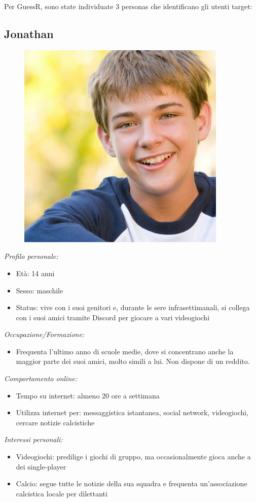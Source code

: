 \noindent Per GuessR, sono state individuate 3 personas che identificano gli utenti target:

\subsection{Jonathan}
\begin{figure}[H]
    \centering
    \includegraphics[width=100mm]{img/personas/jonathan.jpg}
    \label{fig:personas_jonathan}
\end{figure}
\textit{Profilo personale:}
\begin{itemize}
    \item Età: 14 anni
    \item Sesso: maschile
    \item Status: vive con i suoi genitori e, durante le sere infrasettimanali, si collega con i suoi amici tramite Discord per giocare a vari videogiochi
\end{itemize}
\textit{Occupazione/Formazione:}
\begin{itemize}
    \item Frequenta l'ultimo anno di scuole medie, dove si concentrano anche la maggior parte dei suoi amici, molto simili a lui. Non dispone di un reddito.
\end{itemize}
\textit{Comportamento online:}
\begin{itemize}
    \item Tempo su internet: almeno 20 ore a settimana
    \item Utilizza internet per: messaggistica istantanea, social network, videogiochi, cercare notizie calcistiche
\end{itemize}
\textit{Interessi personali:}
\begin{itemize}
    \item Videogiochi: predilige i giochi di gruppo, ma occasionalmente gioca anche a dei single-player
    \item Calcio: segue tutte le notizie della sua squadra e frequenta un'associazione calcistica locale per dilettanti
\end{itemize}

